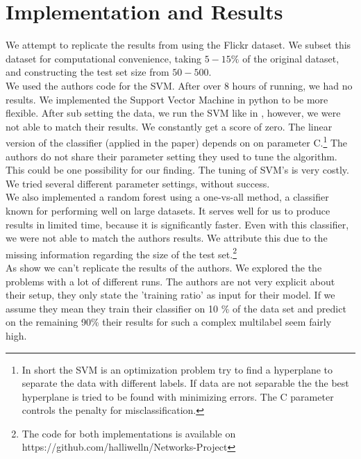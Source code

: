 \documentclass[11pt,letterpaper]{article}
\begin{document}
\section*{Implementation and Results}
We attempt to replicate the results from \cite{latent} using the Flickr dataset. We subset this dataset for computational convenience, taking $5-15\%$ of the original dataset, and constructing the test set size from $50 - 500.$\\
We used the authors code for the SVM. After over $8$ hours of running, we had no results. We implemented the Support Vector Machine in python to be more flexible. After sub setting the data, we run the SVM like in \cite{latent}, however, we were not able to match their results. We constantly get a score of zero. The linear version of the classifier (applied in the paper) depends on on parameter C.\footnote{In short the SVM is an optimization problem try to find a hyperplane to separate the data with different labels. If data are not separable the the best hyperplane is tried to be found with minimizing errors. The C parameter controls the penalty for misclassification.} The authors do not share their parameter setting they used to tune the algorithm. This could be one possibility for our finding. The tuning of SVM's is very costly. We tried several different parameter settings, without success. \\
We also implemented a random forest using a one-vs-all method, a classifier known for performing well on large datasets. It serves well for us to produce results in limited time, because it is significantly faster. Even with this classifier, we were not able to match the authors results. We attribute this due to the missing information regarding the size of the test set.\footnote{The code for both implementations is available on https://github.com/halliwelln/Networks-Project}\\
As show we can't replicate the results of the authors. We explored the the problems with a lot of different runs.
The authors are not very explicit about their setup, they only state the 'training ratio' as input for their model. If we assume they mean they train their classifier on 10 \% of the data set and predict on the remaining 90\% their results for such a complex multilabel seem fairly high.
\end{document}
